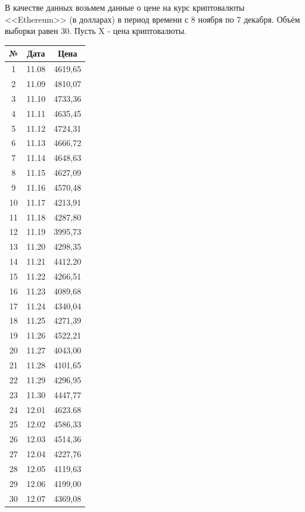 \documentclass[utf8, a4paper, 14pt, russian, oneside]{book}
\begin{document}


\tableofcontents
\newpage


В качестве данных возьмем данные о цене на курс криптовалюты <<Ethereum>> (в долларах) в период времени с 8 ноября по 7 декабря. Объём выборки равен 30.
Пусть X - цена криптовалюты.
\begin{table}[h!]
    \centering
    \begin{tabular}{|c|c|c|}
        \hline
        № & Дата & Цена \\ \hline
        1 & 11.08 & 4619,65 \\ \hline
        2 & 11.09 & 4810,07 \\ \hline
        3 & 11.10 & 4733,36 \\ \hline
        4 & 11.11 & 4635,45 \\ \hline
        5 & 11.12 & 4724,31 \\ \hline
        6 & 11.13 & 4666,72 \\ \hline
        7 & 11.14 & 4648,63 \\ \hline
        8 & 11.15 & 4627,09 \\ \hline
        9 & 11.16 & 4570,48 \\ \hline
        10 & 11.17 & 4213,91 \\ \hline
        11 & 11.18 & 4287,80 \\ \hline
        12 & 11.19 & 3995,73 \\ \hline
        13 & 11.20 & 4298,35 \\ \hline
        14 & 11.21 & 4412,20 \\ \hline
        15 & 11.22 & 4266,51 \\ \hline
        16 & 11.23 & 4089,68 \\ \hline
        17 & 11.24 & 4340,04 \\ \hline
        18 & 11.25 & 4271,39 \\ \hline
        19 & 11.26 & 4522,21 \\ \hline
        20 & 11.27 & 4043,00 \\ \hline
        21 & 11.28 & 4101,65 \\ \hline
        22 & 11.29 & 4296,95 \\ \hline
        23 & 11.30 & 4447,77 \\ \hline
        24 & 12.01 & 4623.68 \\ \hline
        25 & 12.02 & 4586,33 \\ \hline
        26 & 12.03 & 4514,36 \\ \hline
        27 & 12.04 & 4227,76 \\ \hline
        28 & 12.05 & 4119,63 \\ \hline
        29 & 12.06 & 4199,00 \\ \hline
        30 & 12.07 & 4369,08 \\ \hline
    \end{tabular}
\end{table}
\newpage
\end{document}
